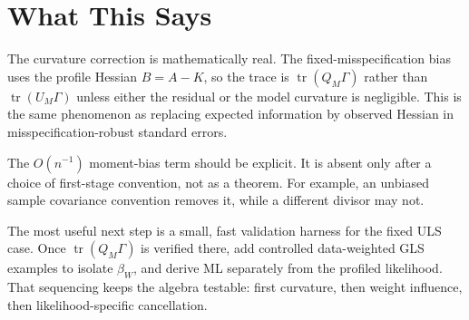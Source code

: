 \documentclass[11pt]{article}
\newcommand{\tr}{\operatorname{tr}}
\theoremstyle{plain}
\theoremstyle{remark}
\begin{document}
\section{What This Says}

The curvature correction is mathematically real. The fixed-misspecification
bias uses the profile Hessian $B=A-K$, so the trace is
$\tr(Q_M\Gamma)$ rather than $\tr(U_M\Gamma)$ unless either the residual or the
model curvature is negligible. This is the same phenomenon as replacing expected
information by observed Hessian in misspecification-robust standard errors.

The $O(n^{-1})$ moment-bias term should be explicit. It is absent only after a
choice of first-stage convention, not as a theorem. For example, an unbiased
sample covariance convention removes it, while a different divisor may not.

The most useful next step is a small, fast validation harness for the fixed ULS
case. Once $\tr(Q_M\Gamma)$ is verified there, add controlled
data-weighted GLS examples to isolate $\beta_W$, and derive ML separately from
the profiled likelihood. That sequencing keeps the algebra testable: first
curvature, then weight influence, then likelihood-specific cancellation.
\end{document}
